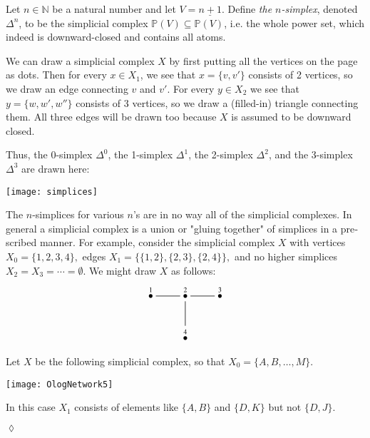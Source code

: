 \documentclass{book}
\def\PP{{\mathbb P}}
\def\NN{{\mathbb N}}
\def\ss{\subseteq}
\def\ul{\underline}
\newcommand{\LMO}[1]{\stackrel{#1}{\bullet}}
\theoremstyle{theoremENG}
\theoremstyle{lemmaENG}
\theoremstyle{propositionENG}
\theoremstyle{corollaryENG}
\theoremstyle{factENG}
\theoremstyle{remarkENG}
\theoremstyle{exampleENG}
\newtheorem{exampleENG}[subsubsection]{\begin{english}Example\end{english}}
\theoremstyle{warningENG}
\theoremstyle{questionENG}
\theoremstyle{guessENG}
\theoremstyle{answerENG}
\theoremstyle{constructionENG}
\theoremstyle{rulesENG}
\theoremstyle{excENG}
\newtheorem{excENG}[subsubsection]{\begin{english}Exercise\end{english}}
\theoremstyle{appENG}
\theoremstyle{definitionENG}
\theoremstyle{notationENG}
\theoremstyle{conjectureENG}
\theoremstyle{postulateENG}
\newenvironment{exerciseENG}{\begin{excENG}}{\hspace*{\fill}$\lozenge$\end{excENG}}
\theoremstyle{theoremRUS}
\theoremstyle{lemmaRUS}
\theoremstyle{propositionRUS}
\theoremstyle{corollaryRUS}
\theoremstyle{factRUS}
\theoremstyle{remarkRUS}
\theoremstyle{exampleRUS}
\theoremstyle{warningRUS}
\theoremstyle{questionRUS}
\theoremstyle{guessRUS}
\theoremstyle{answerRUS}
\theoremstyle{constructionRUS}
\theoremstyle{rulesRUS}
\theoremstyle{excRUS}
\theoremstyle{appRUS}
\theoremstyle{definitionRUS}
\theoremstyle{notationRUS}
\theoremstyle{conjectureRUS}
\theoremstyle{postulateRUS}
\begin{document}
\begin{english}
\begin{exampleENG}
Let $n\in\NN$ be a natural number and let $V=\ul{n+1}$. Define {\em the $n$-simplex}, denoted $\Delta^n$, to be the simplicial complex $\PP(V)\ss\PP(V)$, i.e. the whole power set, which indeed is downward-closed and contains all atoms. 

\begin{russian} \end{russian}

\end{exampleENG}


We can draw a simplicial complex $X$ by first putting all the vertices on the page as dots. Then for every $x\in X_1$, we see that $x=\{v,v'\}$ consists of 2 vertices, so we draw an edge connecting $v$ and $v'$. For every $y\in X_2$ we see that $y=\{w,w',w''\}$ consists of 3 vertices, so we draw a (filled-in) triangle connecting them. All three edges will be drawn too because $X$ is assumed to be downward closed.

\begin{russian} \end{russian}

Thus, the 0-simplex $\Delta^0$, the 1-simplex $\Delta^1$, the 2-simplex $\Delta^2$, and the 3-simplex $\Delta^3$ are drawn here:
\begin{center}
\texttt{[image: simplices]}
\end{center} 

\begin{russian} \end{russian}

The $n$-simplices for various $n$'s are in no way all of the simplicial complexes. In general a simplicial complex is a union or "gluing together" of simplices in a prescribed manner. For example, consider the simplicial complex $X$ with vertices $X_0=\{1,2,3,4\},$ edges $X_1=\{\{1,2\},\{2,3\},\{2,4\}\},$ and no higher simplices $X_2=X_3=\cdots=\emptyset$. We might draw $X$ as follows:
$$\xymatrix{\LMO{1}\ar@{-}[r]&\LMO{2}\ar@{-}[r]\ar@{-}[d]&\LMO{3}\\&\LMO{4}}$$

\begin{russian} \end{russian}

\begin{exerciseENG}

Let $X$ be the following simplicial complex, so that $X_0=\{A,B,\ldots,M\}$. 
\begin{center}
\texttt{[image: OlogNetwork5]}
\end{center} 
In this case $X_1$ consists of elements like $\{A,B\}$ and $\{D,K\}$ but not $\{D,J\}$. 


\end{exerciseENG}
\end{english}
\end{document}
